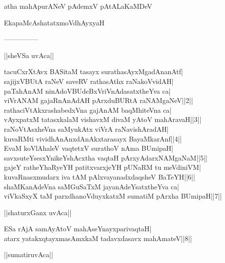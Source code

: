 \documentclass{article}
\begin{document}
\begin{center}
atha mahApurANeV pAdemxV pAtALaKaMDeV
\end{center}

\begin{center}
EkapaMcAshatatxmoVdhAyxyaH
\end{center}

\begin{center}
---------------
\end{center}

\begin{center}
||sheVSa uvAca||
\end{center}

tacuCxrXtAvx BASitaM tasayx surathasAyxMgadAnanAtf|\\
sajijxVBUtA raNeV saveRV rathasAthx raNakoVvidAH|\\
paTa{hA}nAM ninAdoVBUdeBxVriVnAdasatxtheYva ca|\\
viVrANAM gajaRnAnAdAH pArxduBURtA raNAMgaNeV||2||\\
rathaciVtAkxrashabedxVna gajAnAM baqMhiteVna ca|\\
vAyxpatxM tatasxkalaM vishavxM divaM yAtoV mahAravaH||3||\\
raNoVtAsxheVna saMyukAtx viVrA raNavishAradAH|\\
kuvaRMti vividhAnAnxdAnAkxtarasayx BayaMkarAnf||4||\\
EvaM koVlAhaleV vaqtetxV surathoV nAma BUmipaH|\\
savxsuteYsesxYnikeYshAcxtha vaqtaH pArxyAdarxNAMgaNaM||5||\\
gajeY ratheYhaRyeYH patitxvarxjeYH pUNaRM tu meVdiniVM|\\
kuvaRnasxmudarx iva tAM pAlxvayanadxdaqsheV BaTeYH||6||\\
shaMKanAdeVna saMGuSaTxM jayanAdeYsatxtheYva ca|\\
viVkaSxyX taM parxdhanoVduyxkatxM sumatiM pArxha BUmipaH||7||\\

\begin{center}
||shaturxGanx uvAca||
\end{center}

ESa rAjA samAyAtoV mahAseYnayxparivaqtaH|\\
atarx yatakxqtayxmasAmxkaM tadavxdasavx mahAmateV||8||\\

\begin{center}
||sumatiruvAca||
\end{center}
\end{document}
